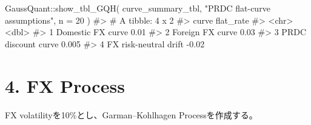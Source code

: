 \documentclass[
  letterpaper,
  DIV=11,
  numbers=noendperiod]{scrreprt}
\newenvironment{Shaded}{\begin{snugshade}}{\end{snugshade}}
\newcommand{\AttributeTok}[1]{\textcolor[rgb]{0.40,0.45,0.13}{#1}}
\newcommand{\CommentTok}[1]{\textcolor[rgb]{0.37,0.37,0.37}{#1}}
\newcommand{\DecValTok}[1]{\textcolor[rgb]{0.68,0.00,0.00}{#1}}
\newcommand{\FunctionTok}[1]{\textcolor[rgb]{0.28,0.35,0.67}{#1}}
\newcommand{\NormalTok}[1]{\textcolor[rgb]{0.00,0.23,0.31}{#1}}
\newcommand{\SpecialCharTok}[1]{\textcolor[rgb]{0.37,0.37,0.37}{#1}}
\newcommand{\StringTok}[1]{\textcolor[rgb]{0.13,0.47,0.30}{#1}}
\begin{document}
\begin{Shaded}
\begin{Highlighting}[]
\NormalTok{GaussQuant}\SpecialCharTok{::}\FunctionTok{show\_tbl\_GQH}\NormalTok{(}
\NormalTok{  curve\_summary\_tbl,}
  \StringTok{"PRDC flat{-}curve assumptions"}\NormalTok{,}
  \AttributeTok{n =} \DecValTok{20}
\NormalTok{)}
\CommentTok{\#\textgreater{} \# A tibble: 4 x 2}
\CommentTok{\#\textgreater{}   curve                 flat\_rate}
\CommentTok{\#\textgreater{}   \textless{}chr\textgreater{}                     \textless{}dbl\textgreater{}}
\CommentTok{\#\textgreater{} 1 Domestic FX curve         0.01 }
\CommentTok{\#\textgreater{} 2 Foreign FX curve          0.03 }
\CommentTok{\#\textgreater{} 3 PRDC discount curve       0.005}
\CommentTok{\#\textgreater{} 4 FX risk{-}neutral drift    {-}0.02}
\end{Highlighting}
\end{Shaded}

\section{4. FX Process}\label{fx-process}

FX volatilityを10\%とし、Garman--Kohlhagen Processを作成する。
\end{document}
